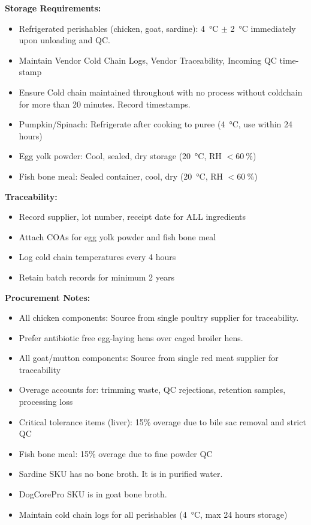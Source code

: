 \textbf{Storage Requirements:}
\begin{itemize}
\item Refrigerated perishables (chicken, goat, sardine): \SI{4}{\celsius} $\pm$ \SI{2}{\celsius} immediately upon unloading and QC.
\item Maintain Vendor Cold Chain Logs, Vendor Traceability, Incoming QC time-stamp
\item Ensure Cold chain maintained throughout with no process without coldchain for more than 20 minutes. Record timestamps. 
\item Pumpkin/Spinach: Refrigerate after cooking to puree (\SI{4}{\celsius}, use within 24 hours)
\item Egg yolk powder: Cool, sealed, dry storage (\SI{20}{\celsius}, RH $<\SI{60}{\percent}$)
\item Fish bone meal: Sealed container, cool, dry (\SI{20}{\celsius}, RH $<\SI{60}{\percent}$)
\end{itemize}

\textbf{Traceability:}
\begin{itemize}
\item Record supplier, lot number, receipt date for ALL ingredients
\item Attach COAs for egg yolk powder and fish bone meal
\item Log cold chain temperatures every 4 hours
\item Retain batch records for minimum 2 years
\end{itemize}

\vspace{1em}

\textbf{Procurement Notes:}
\begin{itemize}
\item All chicken components: Source from single poultry supplier for traceability.
\item Prefer antibiotic free egg-laying hens over caged broiler hens.
\item All goat/mutton components: Source from single red meat supplier for traceability
\item Overage accounts for: trimming waste, QC rejections, retention samples, processing loss
\item Critical tolerance items (liver): 15\% overage due to bile sac removal and strict QC
\item Fish bone meal: 15\% overage due to fine powder QC
\item Sardine SKU has no bone broth. It is in purified water. 
\item DogCorePro SKU is in goat bone broth.
\item Maintain cold chain logs for all perishables (\SI{4}{\celsius}, max 24 hours storage)
\end{itemize}

